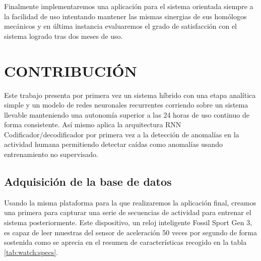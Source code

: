 \documentclass[11pt,a4paper,spanish,twocolumn]{article}
\begin{document}
Finalmente implementaremos una aplicación para el sistema orientada siempre a la facilidad de uso intentando mantener las mismas sinergias de sus homólogos mecánicos y en última instancia evaluaremos el grado de satisfacción con el sistema logrado tras dos meses de uso.

\section{CONTRIBUCIÓN}
Este trabajo presenta por primera vez un sistema híbrido con una etapa analítica simple y un modelo de redes neuronales recurrentes corriendo sobre un sistema llevable manteniendo una autonomía superior a las 24 horas de uso continuo de forma consistente. Así mismo aplica la arquitectura RNN Codificador/decodificador por primera vez a la detección de anomalías en la actividad humana permitiendo detectar caídas como anomalías usando entrenamiento no supervisado.

\subsection{Adquisición de la base de datos}
Usando la misma plataforma para la que realizaremos la aplicación final, creamos una primera para capturar una serie de secuencias de actividad para entrenar el sistema posteriormente. Este dispositivo, un reloj inteligente Fossil Sport Gen 3, es capaz de leer muestras del sensor de aceleración 50 veces por segundo de forma sostenida como se aprecia en el resumen de características recogido en la tabla \ref{tab:watch:specs}.
\end{document}
